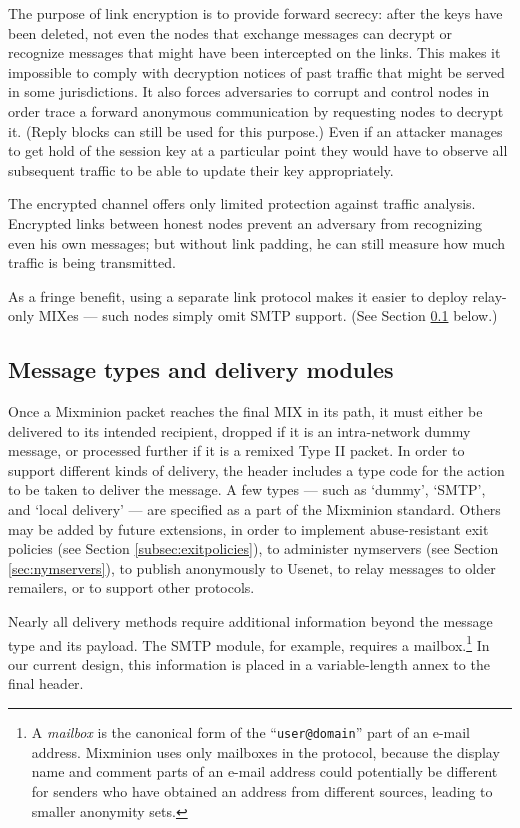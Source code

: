 \documentclass{llncs}
\begin{document}
The purpose of link encryption is to provide forward secrecy: 
after the keys have been deleted, not even the
nodes that exchange messages can decrypt or recognize messages
that might have been intercepted on the links. This makes it
impossible to comply with decryption notices of past traffic 
that might be served in
some jurisdictions.  
It also forces adversaries to 
corrupt and control nodes in order trace
a forward anonymous communication by requesting nodes to decrypt
it. 
(Reply blocks can still be used for this purpose.)  Even if an
attacker manages to get hold of the session key at a particular point
they would have to observe all subsequent traffic to be able to update
their key appropriately.

The encrypted channel offers only limited protection against traffic
analysis. Encrypted links between honest nodes prevent an adversary
from recognizing even his own messages; but without link padding, he
can still measure how much traffic is being transmitted.

As a fringe benefit, using a separate link protocol makes it
easier to deploy relay-only MIXes --- such nodes simply omit SMTP
support.  (See Section \ref{subsec:delivery-modules} below.)

\subsection{Message types and delivery modules}
\label{subsec:delivery-modules}

Once a Mixminion packet reaches the final MIX in its path, it must
either be delivered to its intended recipient, dropped if it is an
intra-network dummy message, or processed further if it is a remixed
Type II packet. In order to support different kinds of
delivery, the header includes a type code for the action to be taken
to deliver the message.  A few types --- such as `dummy', `SMTP', and
`local delivery' --- are specified as a part of the Mixminion
standard.  Others may be added by future extensions, in order to
implement abuse-resistant exit policies (see Section
\ref{subsec:exitpolicies}), to administer nymservers (see Section
\ref{sec:nymservers}), to publish anonymously to Usenet, to relay
messages to older remailers, or to support other protocols.

Nearly all delivery methods require additional information beyond the
message type and its payload.  The SMTP module, for example, requires
a mailbox.\footnote{A {\it mailbox} is the canonical form of the
``{\tt user@domain}'' part of an e-mail address. Mixminion uses only
mailboxes in the protocol, because the display name and comment parts
of an e-mail address could potentially be different for senders who
have obtained an address from different sources, leading to smaller
anonymity sets.}
In our current design, this information is placed
in a variable-length annex to the final header.
\end{document}
